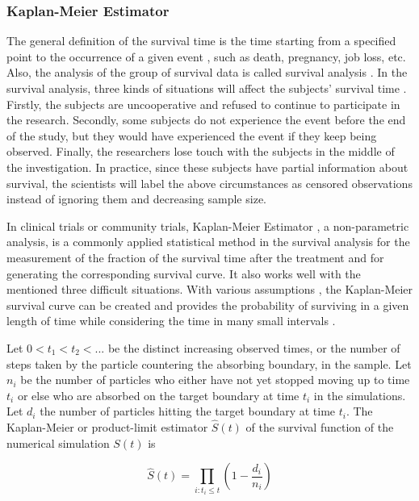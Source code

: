 \subsubsection{Kaplan-Meier Estimator}

The general definition of the survival time is the time starting from a specified point to the occurrence of a given event \cite{bewick2004statistics}, such as death, pregnancy, job loss, etc. Also, the analysis of the group of survival data is called survival analysis \cite{altman1990practical}. In the survival analysis, three kinds of situations will affect the subjects' survival time \cite{goel2010understanding}. Firstly, the subjects are uncooperative and refused to continue to participate in the research. Secondly, some subjects do not experience the event before the end of the study, but they would have experienced the event if they keep being observed. Finally, the researchers lose touch with the subjects in the middle of the investigation. In practice, since these subjects have partial information about survival, the scientists will label the above circumstances as censored observations \cite{bewick2004statistics} instead of ignoring them and decreasing sample size.

In clinical trials or community trials, Kaplan-Meier Estimator \cite{kaplan1958nonparametric}, a non-parametric analysis, is a commonly applied statistical method in the survival analysis for the measurement of the fraction of the survival time after the treatment \cite{aalen2008survival} and for generating the corresponding survival curve. It also works well with the mentioned three difficult
situations. With various assumptions \cite{etikan2017kaplan} \cite{goel2010understanding}, the Kaplan-Meier survival curve can be created and provides the probability of surviving in a given length of time while considering the time in many small intervals \cite{altman1990practical}.


Let $0 < t_1 < t_2 < ...$ be the distinct increasing observed times, or the number of steps taken by the particle countering the absorbing boundary, in the sample. Let $n_i$ be the number of particles who either have not yet stopped moving up to time $t_i$ or else who are absorbed on the target boundary at time $t_i$ in the simulations. Let $d_i$ the number of particles hitting the target boundary at time $t_i$. The Kaplan-Meier or product-limit estimator $\widehat{S}(t)$ of the survival function of the numerical simulation $S(t)$ is \cite{aalen2008survival}

\begin{equation}
  \widehat{S}(t) = \prod_{i:t_i \leq t} (1 - \frac{d_i}{n_i})
\end{equation}




